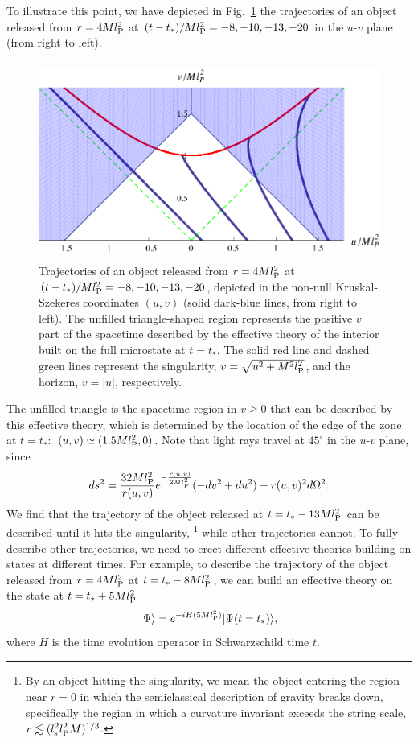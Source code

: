 \documentclass[12pt]{article}
\begin{document}
To illustrate this point, we have depicted in Fig.~\ref{fig:traj} 
the trajectories of an object released from $r = 4M l_{\rm P}^2$ at 
$(t - t_*)/Ml_{\rm P}^2 = -8, -10, -13, -20$ in the $u$-$v$ plane 
(from right to left). 
%
\begin{figure}[t]
\begin{center}
  \includegraphics[height=6.5cm]{eff-th.eps}
\end{center}
\caption{Trajectories of an object released from $r = 4M l_{\rm P}^2$ 
 at $(t - t_*)/Ml_{\rm P}^2 = -8, -10, -13, -20$, depicted in the 
 non-null Kruskal-Szekeres coordinates $(u,v)$ (solid dark-blue 
 lines, from right to left).  The unfilled triangle-shaped region 
 represents the positive $v$ part of the spacetime described by 
 the effective theory of the interior built on the full microstate 
 at $t = t_*$.  The solid red line and dashed green 
 lines represent the singularity, $v = \sqrt{u^2 + M^2 l_{\rm P}^2}$, 
 and the horizon, $v = |u|$, respectively.}
\label{fig:traj}
\end{figure}
%
The unfilled triangle is the spacetime region in $v \geq 0$ that 
can be described by this effective theory, which is determined by 
the location of the edge of the zone at $t = t_*$:\ $(u,v) \simeq 
(1.5 Ml_{\rm P}^2, 0)$.  Note that light rays travel at $45^\circ$ 
in the $u$-$v$ plane, since
%
\begin{equation}
  ds^2 = \frac{32Ml_{\rm P}^2}{r(u,v)} 
    e^{-\frac{r(u,v)}{2Ml_{\rm P}^2}} 
    (-dv^2 + du^2) + r(u,v)^2 d\Omega^2.
\label{eq:met-uv}
\end{equation}
%
We find that the trajectory of the object released at 
$t = t_* - 13 Ml_{\rm P}^2$ can be described until it hits the 
singularity,%
\footnote{By an object hitting the singularity, we mean the 
 object entering the region near $r = 0$ in which the semiclassical 
 description of gravity breaks down, specifically the region in 
 which a curvature invariant exceeds the string scale, $r \lesssim 
 (l_{\rm s}^2 l_{\rm P}^2 M)^{1/3}$.}
while other trajectories cannot.  To fully describe other 
trajectories, we need to erect different effective theories 
building on states at different times.  For example, to describe 
the trajectory of the object released from $r = 4M l_{\rm P}^2$ 
at $t = t_* - 8 Ml_{\rm P}^2$, we can build an effective theory 
on the state at $t = t_* + 5 Ml_{\rm P}^2$
%
\begin{equation}
  \ket{\Psi} = e^{-iH(5 Ml_{\rm P}^2)} \ket{\Psi(t=t_*)},
\label{eq:t-5M}
\end{equation}
%
where $H$ is the time evolution operator in Schwarzschild time $t$.
\end{document}
